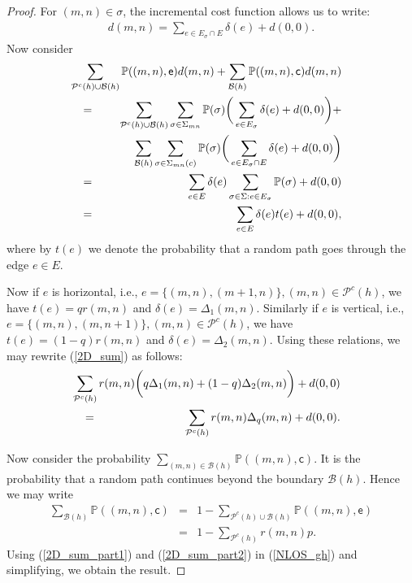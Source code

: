 \documentclass[conference]{IEEEtran}
\begin{document}
\begin{proof}
For $(m,n) \in \sigma$, the incremental cost function allows us to write:
\begin{eqnarray}
 d(m,n)=\sum_{e\in E_\sigma \cap E}\delta(e) + d(0,0).
\end{eqnarray}
Now consider 
\begin{eqnarray}
 &&\hspace{-1cm}\sum_{\mathcal{P}^c(h)\cup \mathcal{B}(h)}\mathbb{P}((m,n),
\mathsf{e})d(m,n)+ \sum_{\mathcal{B}(h)}\mathbb{P}((m,n),\mathsf{c})d(m,n)\nonumber \\
&=& \sum_{\mathcal{P}^c(h)\cup \mathcal{B}(h)}\sum_{\sigma\in\Sigma_{mn}}\mathbb{P}(\sigma)\bigg(\sum_{e\in E_\sigma}\delta(e)+d(0,0)\bigg) + \nonumber \\
&&\sum_{\mathcal{B}(h)}\sum_{\sigma \in\Sigma_{mn}(c)}\mathbb{P}(\sigma)
\bigg(\sum_{e\in E_\sigma \cap E}\delta(e)+d(0,0)\bigg)\nonumber \\
&=&\sum_{e\in E} \delta(e) \sum_{\sigma \in \Sigma : e\in E_\sigma}\mathbb{P}(\sigma) + d(0,0)\nonumber \\
&=&\sum_{e\in E} \delta(e) t(e) + d(0,0), \label{2D_sum}
\end{eqnarray}
where by $t(e)$ we denote the probability that a random path goes through the edge $e\in E$.

Now if $e$ is horizontal, i.e., $e=\{(m,n),(m+1,n)\}, (m,n)\in\mathcal{P}^c(h)$, we have $t(e)=q r(m,n)$ and $\delta(e)=\Delta_1(m,n)$. Similarly if $e$ is vertical, i.e., $e=\{(m,n),(m,n+1)\}, (m,n)\in\mathcal{P}^c(h)$, we have $t(e)=(1-q) r(m,n)$ and $\delta(e)=\Delta_2(m,n)$. Using these relations, we may rewrite (\ref{2D_sum}) as follows:
\begin{eqnarray}
&& \hspace{-1cm}\sum_{\mathcal{P}^c(h)}r(m,n)\bigg(q\Delta_1(m,n)+(1-q)\Delta_2(m,n)\bigg)+d(0,0) \nonumber\\
&=&\sum_{\mathcal{P}^c(h)}r(m,n)\Delta_q(m,n)+d(0,0).\label{2D_sum_part1}
\end{eqnarray}

Now consider the probability $\sum_{(m,n)\in \mathcal{B}(h)}\mathbb{P}((m,n),\mathsf{c})$. It is the probability that a random path continues beyond the boundary $\mathcal{B}(h)$. Hence we may write
\begin{eqnarray}
\sum_{\mathcal{B}(h)}\mathbb{P}((m,n),\mathsf{c})&=&1-\sum_{\mathcal{P}^c(h)\cup\mathcal{B}(h)}\mathbb{P}((m,n),\mathsf{e})\nonumber\\
&=&1-\sum_{\mathcal{P}^c(h)}r(m,n)p. \label{2D_sum_part2}
\end{eqnarray}
Using (\ref{2D_sum_part1}) and (\ref{2D_sum_part2}) in (\ref{NLOS_gh}) and simplifying, we obtain the result. 
\end{proof}
\end{document}
